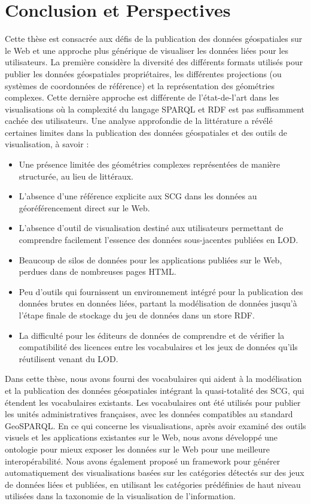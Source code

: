 \documentclass[a4paper,11pt,twoside]{report}
\begin{document}
\chapter*{ Conclusion et Perspectives}
\label{ch:conc}
Cette thèse est consacrée aux défis de la publication des données géospatiales sur le Web et une approche plus générique de visualiser les données liées pour les utilisateurs. La première considère la diversité des différents formats utilisés pour publier les données géospatiales propriétaires, les différentes projections (ou systèmes de coordonnées de référence) et la représentation des géométries complexes. Cette dernière approche est différente de l'état-de-l'art dans les visualisations où la complexité du langage SPARQL et RDF est pas suffisamment cachée des utilisateurs. Une analyse approfondie de la littérature a révélé certaines limites dans la publication des données géospatiales et des outils de visualisation, à savoir :
\begin{itemize}
 \item Une présence limitée des géométries complexes représentées de manière structurée, au lieu de littéraux.
 \item L'absence d'une référence explicite aux SCG dans les données au géoréférencement direct sur le Web.
 \item L'absence d'outil de visualisation destiné aux utilisateurs permettant de comprendre facilement l'essence des données sous-jacentes publiées en LOD.
 \item Beaucoup de silos de données pour les applications publiées sur le Web, perdues dans de nombreuses pages HTML.
 \item Peu d'outils qui fournissent un environnement intégré pour la publication des données brutes en données liées, partant la modélisation de données jusqu'à l'étape finale de stockage du jeu de données dans un store RDF.
 \item La difficulté pour les éditeurs de données de comprendre et de vérifier la compatibilité des licences entre les vocabulaires et les jeux de données qu'ils réutilisent venant du LOD.
\end{itemize}

Dans cette thèse, nous avons fourni des vocabulaires qui aident à la modélisation et la publication des données géospatiales intégrant la quasi-totalité des SCG, qui étendent les vocabulaires existants. Les vocabulaires ont été utilisés pour publier les unités administratives françaises, avec les données compatibles au standard GeoSPARQL. En ce qui concerne les visualisations, après avoir examiné des outils visuels et les applications existantes sur le Web, nous avons développé une ontologie pour mieux exposer les données sur le Web pour une meilleure interopérabilité. Nous avons également proposé un framework pour générer automatiquement des visualisations basées sur les catégories détectés sur des jeux de données liées et publiées, en utilisant les catégories prédéfinies de haut niveau utilisées dans la taxonomie de la visualisation de l'information.
\end{document}
